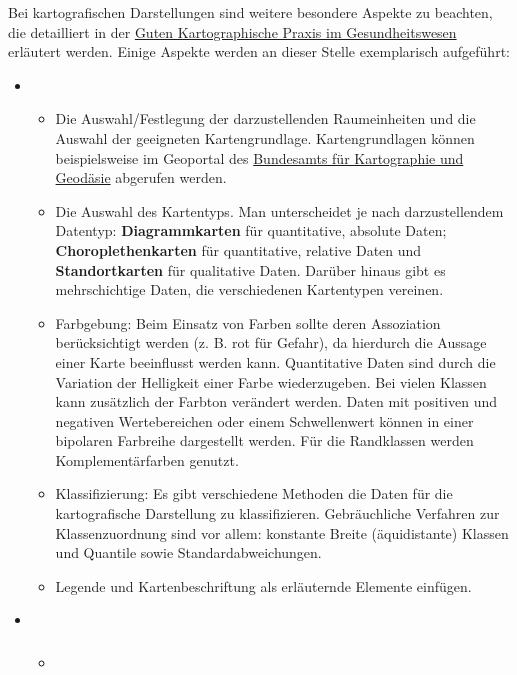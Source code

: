 \documentclass{article}
\begin{document}
\begin{enumerate}
\end{enumerate}

Bei kartografischen Darstellungen sind weitere besondere Aspekte zu beachten, die detailliert in der \href{file:///C:/Users/OAUser/AppData/Local/Temp/ssoar-2017-augustin_et_al-Gute_Kartographische_Praxis_im_Gesundheitswesen.pdf}{Guten Kartographische Praxis im Gesundheitswesen} erläutert werden. Einige Aspekte werden an dieser Stelle exemplarisch aufgeführt: 

\begin{itemize}
\item 
\begin{itemize}
\item Die Auswahl/Festlegung der darzustellenden Raumeinheiten und die Auswahl der geeigneten Kartengrundlage. Kartengrundlagen können beispielsweise im Geoportal des  \href{https://www.geoportal.de/}{Bundesamts für Kartographie und Geodäsie} abgerufen werden. 


\item Die Auswahl des Kartentyps. Man unterscheidet je nach darzustellendem Datentyp: \textbf{Diagrammkarten} für quantitative, absolute Daten; \textbf{Choroplethenkarten} für  quantitative, relative Daten und \textbf{Standortkarten} für qualitative Daten. Darüber hinaus gibt es mehrschichtige Daten, die verschiedenen Kartentypen vereinen.


\item Farbgebung: Beim Einsatz von Farben sollte deren Assoziation berücksichtigt werden (z. B. rot für Gefahr), da hierdurch die Aussage einer Karte beeinflusst werden kann. Quantitative Daten sind durch die Variation der Helligkeit einer Farbe wiederzugeben. Bei vielen Klassen kann zusätzlich der Farbton verändert werden. Daten mit positiven und negativen Wertebereichen oder einem Schwellenwert können in einer bipolaren Farbreihe dargestellt werden. Für die Randklassen werden Komplementärfarben genutzt.


\item Klassifizierung: Es gibt verschiedene Methoden die Daten für die kartografische Darstellung zu klassifizieren. Gebräuchliche Verfahren zur Klassenzuordnung sind vor allem: konstante Breite (äquidistante) Klassen und Quantile sowie Standardabweichungen.


\item Legende und Kartenbeschriftung als erläuternde Elemente einfügen.


\end{itemize}

\item 
\begin{itemize}
\item \subsubsection{}\label{H1199864}



\end{itemize}

\end{itemize}
\end{document}
